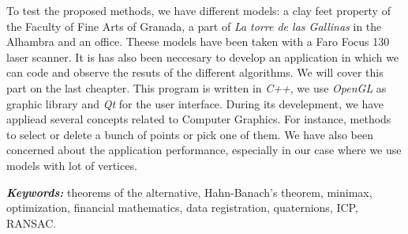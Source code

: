 To test the proposed methods, we have different models: a clay feet property of the Faculty of Fine Arts of Granada, a part of \textit{La torre de las Gallinas} in the Alhambra and an office. Theese models have been taken with a Faro Focus 130 laser scanner. It is has also been neccesary to develop an application in which we can code and observe the resuts of the different algorithms. We will cover this part on the last cheapter. This program is written in \textit{C++}, we use \textit{OpenGL} as graphic library and \textit{Qt} for the user interface. During its develepment, we have appliead several concepts related to Computer Graphics. For instance, methods to select or delete a bunch of points or pick one of them. We have also been concerned about the application performance, especially in our case where we use models with lot of vertices.\\

\providecommand{\keywords}[1]
{
	\small	
	\textbf{\textit{Keywords: }} #1
}
\keywords{theorems of the alternative, Hahn-Banach's theorem, minimax, optimization, financial mathematics, data registration, quaternions, ICP, RANSAC.}